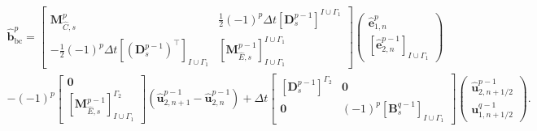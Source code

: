 \documentclass{elsarticle}
\newcommand*{\dual}[1]{\ensuremath{\widehat{#1}}}
\begin{document}
\begin{equation}
\begin{aligned}
\dual{\mathbf{b}}^{p}_{\mathrm{bc}} = \begin{bmatrix}
        \mathbf{M}^p_{\dual{C}, s} & \frac{1}{2}(-1)^p\Delta t[\mathbf{D}^{p-1}_s]^{I\cup \Gamma_1} \\
        -\frac{1}{2}(-1)^p\Delta t [(\mathbf{D}_{s}^{p-1})^\top]_{I\cup \Gamma_1} & [\mathbf{M}^{p-1}_{\dual{E}, s}]_{I\cup \Gamma_1}^{I\cup \Gamma_1}
    \end{bmatrix}\begin{pmatrix}
    \dual{\mathbf{e}}^p_{1, n} \\
    [\dual{\mathbf{e}}^{p-1}_{2, n}]_{I\cup \Gamma_1}
    \end{pmatrix} \\
    - (-1)^p
    \begin{bmatrix}
         \mathbf{0} \\
        [\mathbf{M}^{p-1}_{\dual{E}, s}]_{I\cup \Gamma_1}^{\Gamma_2}
    \end{bmatrix}(\dual{\mathbf{u}}^{p-1}_{2, n+1} - \dual{\mathbf{u}}^{p-1}_{2, n})
    + \Delta t \begin{bmatrix}
        [\mathbf{D}^{p-1}_s]^{\Gamma_2} & \mathbf{0}\\
        \mathbf{0} & (-1)^p[\mathbf{B}^{q-1}_{s}]_{I \cup \Gamma_1}
    \end{bmatrix}
    \begin{pmatrix}
        \dual{\mathbf{u}}^{p-1}_{2, n+1/2} \\
        \mathbf{u}^{q-1}_{1, n+1/2}
    \end{pmatrix}.
\end{aligned}
\end{equation}
\end{document}
